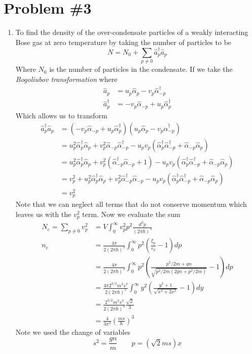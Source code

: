 \documentclass[11pt]{article}
\numberwithin{equation}{section}
\newcommand{\alphaH}{\hat{\alpha}}
\newcommand{\alphaHD}{\hat{\alpha}^{\dagger}}
\begin{document}
\section{Problem \#3}
\begin{enumerate}[(1)]
\item To find the density of the over-condensate particles of a weakly interacting Bose 
gas at zero temperature by taking the number of particles to be
$$N = N_0 + \sum_{p\ne0}\hat{a}^{\dagger}_p\hat{a}_{p}$$
Where $N_0$ is the number of particles in the condensate. If we take the \emph{Bogoliubov
transformation} where
\begin{align*}
\hat{a}_{p} &= u_p\alphaH_p-v_p\alphaHD_{-p}\\
\hat{a}^{\dagger}_{p} &= -v_p\alphaH_{-p} + u_p\alphaHD_p
\end{align*}
Which allows us to transform 
\begin{align*}
\hat{a}^{\dagger}_p\hat{a}_{p} &=\left(-v_p\alphaH_{-p} + u_p\alphaHD_p\right) \left(u_p\alphaH_p-v_p\alphaHD_{-p}\right)\\
&= u_p^2\alphaHD_p\alphaH_p + v_p^2\alphaH_{-p}\alphaHD_{-p} -u_pv_p\left(\alphaHD_{p}\alphaHD_{-p}+\alphaH_{-p}\alphaH_{p}\right)\\
&= u_p^2\alphaHD_p\alphaH_p + v_p^2\left(\alphaHD_{-p}\alphaH_{-p}+1\right) -u_pv_p\left(\alphaHD_{p}\alphaHD_{-p}+\alphaH_{-p}\alphaH_{p}\right)\\
&= v_p^2 + u_p^2\alphaHD_p\alphaH_p + v_p^2\alphaHD_{-p}\alphaH_{-p} -u_pv_p\left(\alphaHD_{p}\alphaHD_{-p}+\alphaH_{-p}\alphaH_{p}\right)\\
&= v_p^2
\end{align*}
Note that we can neglect all terms that do not conserve momentum which leaves us with 
the $v_p^2$ term. Now we evaluate the sum 
\begin{align*}
N_{e} = \sum_{p\ne{0}}v_p^2 &= V\int_{0}^{\infty}v_p^2p^2\frac{d^3p}{(2\pi\hbar)^3}\\
n_e &= \frac{4\pi}{2(2\pi\hbar)^3}\int_{0}^{\infty}p^2\left(\frac{\xi_p}{\varepsilon_p}-1\right)dp\\
&= \frac{4\pi}{2(2\pi\hbar)^3}\int_{0}^{\infty}p^2\left(\frac{p^2/2m+gn}{\sqrt{p^2/2m(2gn+p^2/2m)}}-1\right)dp\\
&= \frac{4\pi2^{3/2}m^3s^3}{2(2\pi\hbar)^3}\int_{0}^{\infty}y^2\left(\frac{y^2+1}{\sqrt{x^4+2x^2}}-1\right)dy\\
&= \frac{2^{3/2}m^3s^3}{2(2\pi\hbar)^3}\frac{\sqrt{2}}{3}\\
&= \frac{4}{3\pi^2}\left(\frac{ms}{\hbar}\right)^3
\end{align*}
Note we used the change of variables 
$$s^2=\frac{gn}{m}\qquad p=(\sqrt{2}ms)x$$


\end{enumerate}
\end{document}
